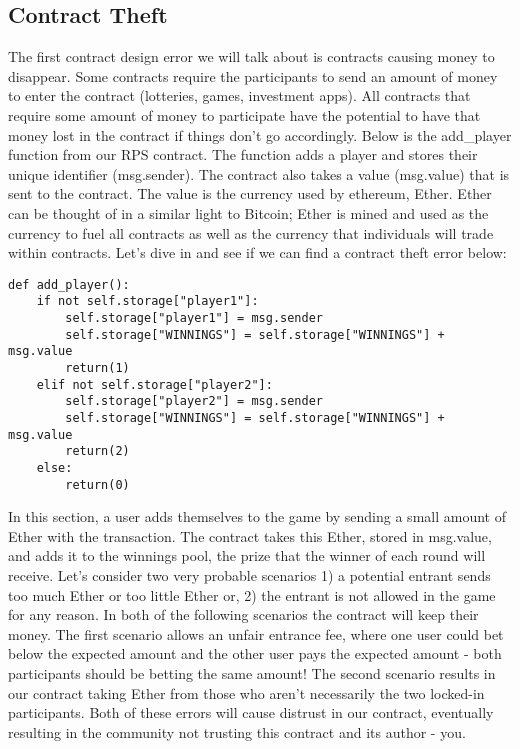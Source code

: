 \documentclass[12pt]{article}
\begin{document}
\subsection{Contract Theft}
The first contract design error we will talk about is contracts causing money to disappear. Some contracts require the participants to send an amount of money to enter the contract (lotteries, games, investment apps). All contracts that require some amount of money to participate have the potential to have that money lost in the contract if things don't go accordingly. Below is the add\_player function from our RPS contract. The function adds a player and stores their unique identifier (msg.sender). The contract also takes a value (msg.value) that is sent to the contract. The value is the currency used by ethereum, Ether. Ether can be thought of in a similar light to Bitcoin; Ether is mined and used as the currency to fuel all contracts as well as the currency that individuals will trade within contracts. Let's dive in and see if we can find a contract theft error below: 

\begin{lstlisting}
def add_player():
	if not self.storage["player1"]:
		self.storage["player1"] = msg.sender
		self.storage["WINNINGS"] = self.storage["WINNINGS"] + msg.value
		return(1)
	elif not self.storage["player2"]:
		self.storage["player2"] = msg.sender
		self.storage["WINNINGS"] = self.storage["WINNINGS"] + msg.value
		return(2)
	else:
		return(0)
\end{lstlisting}

In this section, a user adds themselves to the game by sending a small amount of Ether with the transaction. The contract takes this Ether, stored in msg.value, and adds it to the winnings pool, the prize that the winner of each round will receive. Let's consider two very probable scenarios 1) a potential entrant sends too much Ether or too little Ether or, 2) the entrant is not allowed in the game for any reason. In both of the following scenarios the contract will keep their money. The first scenario allows an unfair entrance fee, where one user could bet below the expected amount and the other user pays the expected amount - both participants should be betting the same amount! The second scenario results in our contract taking Ether from those who aren't necessarily the two locked-in participants. Both of these errors will cause distrust in our contract, eventually resulting in the community not trusting this contract and its author - you.
\end{document}
